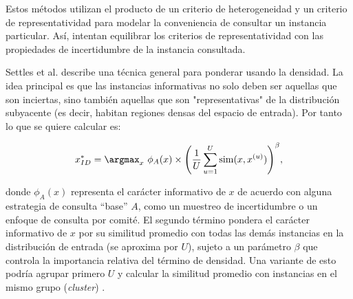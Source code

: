 
Estos métodos utilizan el producto de un criterio de heterogeneidad y un criterio de representatividad para modelar la conveniencia de consultar un
instancia particular. Así, intentan equilibrar los criterios de representatividad con las propiedades de incertidumbre de la instancia consultada. 

Settles et al. \cite{settles2008analysis} describe una técnica general para ponderar usando la densidad. La idea principal es que las instancias informativas no solo deben ser aquellas que son inciertas, sino también aquellas que son "representativas" de la distribución subyacente (es decir, habitan regiones densas del espacio de entrada). Por tanto lo que se quiere calcular es: 


\begin{equation}
x_{ID}^* =  \argmax_x \ \phi_A(x) \times {\left( \frac{1}{U} \sum_{u = 1}^{U} \mathrm{sim}(x,x^{(u)}) \right)}^{\beta},
\end{equation}


donde $\phi_A(x)$ representa el carácter informativo de $x$ de acuerdo con alguna estrategia de consulta “base” $A$, como un muestreo de incertidumbre o un enfoque de consulta por comité. El segundo término pondera el carácter informativo de $x$ por su similitud promedio con todas las demás instancias en la distribución de entrada (se aproxima por $U$), sujeto a un parámetro $\beta$ que controla la importancia relativa del término de densidad. Una variante de esto podría agrupar primero $U$ y calcular la similitud promedio con instancias en el mismo grupo (\textit{cluster}) \cite{settles2009survey}.



